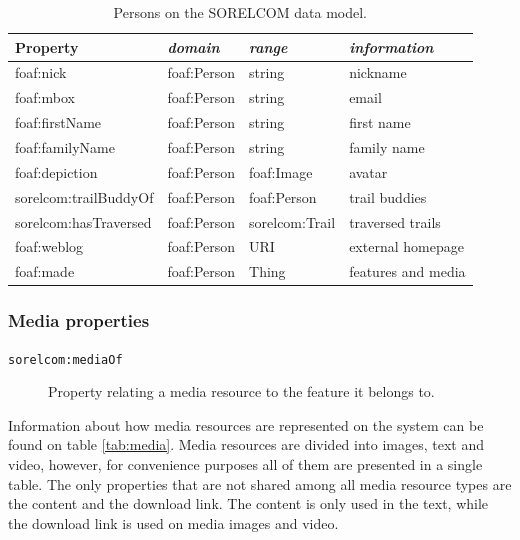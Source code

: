 \begin{table}[ht]
  \centering
  \caption{Persons on the SORELCOM data model.}\label{tab:user}
  \begin{tabular}{llll}
    \toprule
      \textbf{Property} & \emph{domain}  & \emph{range} & \emph{information}\\
    \midrule
      foaf:nick & foaf:Person  & string & nickname \\
      foaf:mbox & foaf:Person  & string & email \\
      foaf:firstName & foaf:Person  & string & first name \\
      foaf:familyName & foaf:Person  & string & family name \\
      foaf:depiction & foaf:Person  & foaf:Image & avatar \\
      sorelcom:trailBuddyOf & foaf:Person  & foaf:Person & trail buddies \\
      sorelcom:hasTraversed & foaf:Person & sorelcom:Trail & traversed trails \\
      foaf:weblog & foaf:Person  & URI & external homepage \\
      foaf:made & foaf:Person  & Thing & features and media \\
    \bottomrule
  \end{tabular}
\end{table}

\subsubsection*{Media properties}

\begin{description}
\item[\texttt{sorelcom:mediaOf}] Property relating a media resource to the feature it belongs to.
\end{description}

Information about how media resources are represented on the system can be found on table \ref{tab:media}. Media resources are divided into images, text and video, however, for convenience purposes all of them are presented in a single table. The only properties that are not shared among all media resource types are the content and the download link. The content is only used in the text, while the download link is used on media images and video.

